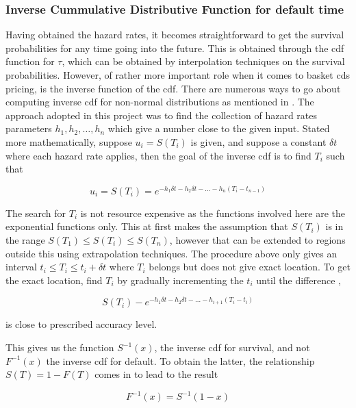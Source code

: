 \documentclass[a4paper,12pt]{article}
\begin{document}
\subsubsection{Inverse Cummulative Distributive Function for default time}
Having obtained the hazard rates, it becomes straightforward to get the survival probabilities for any time going into the future. This is obtained through the cdf function for $\tau$, which can be obtained by interpolation techniques on the survival probabilities. However, of rather more important role when it comes to basket cds pricing, is the inverse function of the cdf. There are numerous ways to go about computing inverse cdf for non-normal distributions as mentioned in \cite{peter_jackel}. The approach adopted in this project was to find the collection of hazard rates parameters $h_1, h_2, \dots , h_n$ which give a number close to the given input. Stated more mathematically, suppose $u_i = S(T_i)$ is given, and suppose a constant $\delta t$ where each hazard rate applies, then the goal of the inverse cdf is to find $T_i$ such that 

$$u_i = S(T_i) = e^{-h_1\delta t - h_2 \delta t - \dots - h_n(T_i - t_{n - 1})} $$

The search for $T_i$ is not resource expensive as the functions involved here are the exponential functions only. This at first makes the assumption that $S(T_i)$ is in the range $S(T_1) \leq S(T_i) \leq S(T_n)$, however that can be extended to regions outside this using extrapolation techniques. The procedure above only gives an interval $t_i \leq T_i \leq t_i + \delta t$ where $T_i$ belongs but does not give exact location. To get the exact location, find $T_i$ by gradually incrementing the $t_i$ until the difference , 

$$S(T_i) - e^{-h_1\delta t - h_2 \delta t - \dots - h_{i + 1}(T_i - t_{i})} $$

is close to prescribed accuracy level. 

This gives us the function $S^{-1}(x)$, the inverse cdf for survival, and not $F^{-1}(x)$ the inverse cdf for default. To obtain the latter, the relationship $S(T) = 1 - F(T)$ comes in to lead to the result 

\begin{equation}
F^{-1}(x) = S^{-1}(1 - x)
\end{equation}
\end{document}
